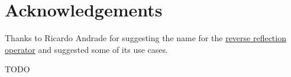 \section{Acknowledgements}

Thanks to Ricardo Andrade for suggesting the name \verb@unreflexpr@ for
the \hyperref[fut-reverse-reflection]{reverse reflection operator} and
suggested some of its use cases.

TODO
